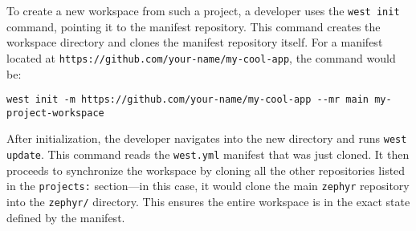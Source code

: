 To create a new workspace from such a project, a developer uses the \texttt{west init} command, pointing it to the manifest repository. This command creates the workspace directory and clones the manifest repository itself. For a manifest located at \texttt{https://github.com/your-name/my-cool-app}, the command would be:

\begin{verbatim}
west init -m https://github.com/your-name/my-cool-app --mr main my-project-workspace
\end{verbatim}

After initialization, the developer navigates into the new directory and runs \texttt{west update}. This command reads the \texttt{west.yml} manifest that was just cloned. It then proceeds to synchronize the workspace by cloning all the other repositories listed in the \texttt{projects:} section—in this case, it would clone the main \texttt{zephyr} repository into the \texttt{zephyr/} directory. This ensures the entire workspace is in the exact state defined by the manifest.

